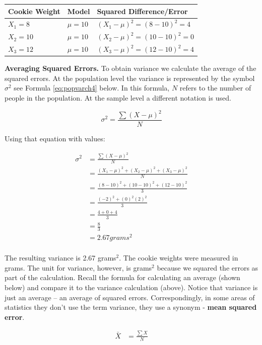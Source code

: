 \documentclass[
]{krantz}
\begin{document}
\begin{longtable}[]{@{}lll@{}}
\toprule
Cookie Weight & Model & Squared Difference/Error \\
\midrule
\endhead
\(X_1 = 8\) & \(\mu = 10\) & \((X_1 - \mu)^2 =(8 - 10)^2= 4\) \\
\(X_2 = 10\) & \(\mu = 10\) & \((X_2 - \mu)^2 =(10 - 10)^2= 0\) \\
\(X_3 = 12\) & \(\mu = 10\) & \((X_3 - \mu)^2 =(12 - 10)^2= 4\) \\
\bottomrule
\end{longtable}

\textbf{Averaging Squared Errors.} To obtain variance we calculate the average of the squared errors. At the population level the variance is represented by the symbol \(\sigma^2\) see Formula \eqref{eq:popvarch4} below. In this formula, \(N\) refers to the number of people in the population. At the sample level a different notation is used.

\begin{equation} 
\sigma^2 = \frac{\sum{(X - \mu)^2}}{N}
      \label{eq:popvarch4}
\end{equation}

Using that equation with values:

\[
\begin{aligned} 
\sigma^2 &= \frac{\sum{(X - \mu)^2}}{N}\\
&= \frac{(X_1-\mu)^2 + (X_2-\mu)^2 + (X_3-\mu)^2}{N}  \\ 
&= \frac{(8-10)^2 + (10-10)^2 + (12-10)^2}{3}\\
&= \frac{(-2)^2 + (0)^2 (2)^2}{3} \\
&= \frac{4 + 0 + 4}{3} \\
&= \frac{8}{3} \\
&= 2.67 grams^2 \\
\end{aligned} 
\]

The resulting variance is 2.67 grams\(^2\). The cookie weights were measured in grams. The unit for variance, however, is grams\(^2\) because we squared the errors as part of the calculation. Recall the formula for calculating an average (shown below) and compare it to the variance calculation (above). Notice that variance is just an average -- an average of squared errors. Correspondingly, in some areas of statistics they don't use the term variance, they use a synonym - \textbf{mean squared error}.

\[
\begin{aligned} 
\bar{X} &= \frac{\sum{X}}{N} \\
\end{aligned} 
\]
\end{document}
